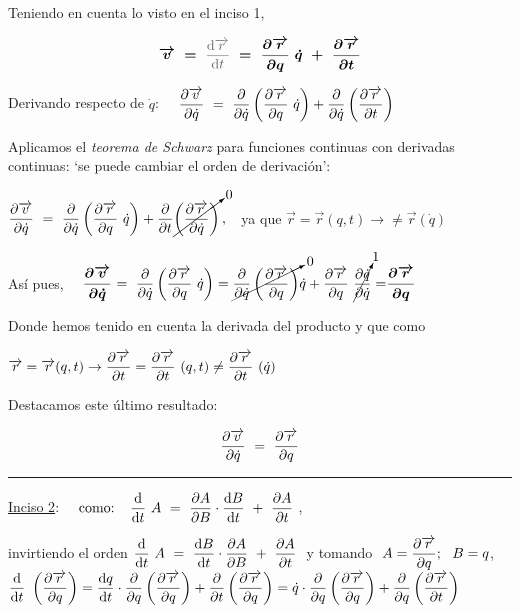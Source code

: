 Teniendo en cuenta lo visto en el inciso 1,

\begin{equation}
\label{T2PDD4}
\boldsymbol{ \overrightarrow v \ = } \ \textcolor{gris}{ \dv{\overrightarrow r}{t} } \ \boldsymbol{ = \ \pdv{\overrightarrow r}{q}\ \dot q \  + \   \pdv{\overrightarrow r}{t} }
\end{equation}

Derivando respecto de $\dot q$: $\quad \displaystyle \pdv{\overrightarrow v}{\dot q} \ = \ \pdv{\dot q} \left( \pdv{\overrightarrow r}{q} \ \dot q \right) + \pdv{\dot q} \left(\pdv{\overrightarrow r}{t} \right) $

Aplicamos el \emph{teorema de Schwarz} para funciones continuas con derivadas continuas: `se puede cambiar el orden de derivación':

$\displaystyle \pdv{\overrightarrow v}{\dot q} \ = \ \pdv{\dot q} \left( \pdv{\overrightarrow r}{q} \ \dot q \right) + \pdv{ t} \cancelto{0}{\left(\pdv{\overrightarrow r}{\dot q} \right)} \, , \ \ $ ya que $\overrightarrow r=\overrightarrow r(q,t) \to  \neq \overrightarrow r(\dot q)$

Así pues, $\quad \displaystyle \boldsymbol{ \pdv{\overrightarrow v}{\dot q} } \ = \ \pdv{\dot q} \left( \pdv{\overrightarrow r}{q} \ \dot q \right) =
\cancelto{0}{\pdv{\dot q} \left( \pdv{\overrightarrow r}{q} \right)} \dot q + \pdv{\overrightarrow r}{q} \ \cancelto{1}{\pdv{\dot q}{\dot q} } = \boldsymbol{ \pdv{\overrightarrow r}{q} }$

Donde hemos tenido en cuenta la derivada del producto y que como

$\displaystyle \overrightarrow r = \overrightarrow r(q,t) \to \pdv{\overrightarrow r}{t}=\pdv{\overrightarrow r}{t} \ (q,t) \neq  \pdv{\overrightarrow r}{t} \ (\dot q)$%

\begin{multicols}{2}
Destacamos este último resultado:	

\begin{equation}
\label{T2UR1}
\pdv{\overrightarrow v}{\dot q} \ = \ \pdv{\overrightarrow r}{q} 
\end{equation}
\end{multicols}

\rule{150pt}{0.1pt}

\underline{Inciso 2}:  $\quad \text{como: } \ \ \displaystyle \dv{t} \ A \ = \ \pdv{A}{B} \cdot \dv{B}{t} \ + \ \pdv{A}{t} $ , 

invirtiendo el orden $\displaystyle \dv{t} \ A \ = \ \dv{B}{t} \cdot  \pdv{A}{B} \ + \ \pdv{A}{t} \ $ y tomando $\ A=\displaystyle \pdv{\overrightarrow r}{q};\ \ B=q$,
$\displaystyle 	\dv{t} \ \left( \pdv{\overrightarrow r}{q}\right) 
= \dv{q}{t} \cdot \pdv{q} \left( \pdv{\overrightarrow r}{q} \right)  +
\pdv{t} \left( \pdv{\overrightarrow r}{q}  \right)=
\dot q \cdot \pdv{q} \left( \pdv{\overrightarrow r}{q} \right)  +
\pdv{q} \left( \pdv{\overrightarrow r}{t}  \right)$

